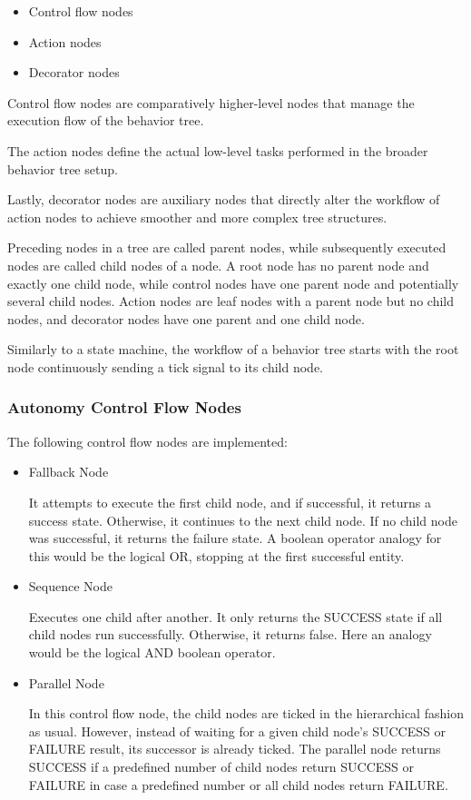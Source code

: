 \begin{itemize}
    \item Control flow nodes
    \item Action nodes
    \item Decorator nodes
    \end{itemize}
    
    Control flow nodes are comparatively higher-level nodes that manage the execution flow of the behavior tree.
    
    The action nodes define the actual low-level tasks performed in the broader behavior tree setup. 
    
    Lastly, decorator nodes are auxiliary nodes that directly alter the workflow of action nodes to achieve smoother and more complex tree structures.
    
    Preceding nodes in a tree are called parent nodes, while subsequently executed nodes are called child nodes of a node. A root node has no parent node and exactly one child node, while control nodes have one parent node and potentially several child nodes. Action nodes are leaf nodes with a parent node but no child nodes, and decorator nodes have one parent and one child node.

    Similarly to a state machine, the workflow of a behavior tree starts with the root node continuously sending a tick signal to its child node. 

    

\subsubsection{Autonomy Control Flow Nodes}

The following control flow nodes are implemented:

\begin{itemize}
    \item Fallback Node
    
    It attempts to execute the first child node, and if successful, it returns a success state. Otherwise, it continues to the next child node. If no child node was successful, it returns the failure state. A boolean operator analogy for this would be the logical OR, stopping at the first successful entity.
    \item Sequence Node
    
    Executes one child after another. It only returns the SUCCESS state if all child nodes run successfully. Otherwise, it returns false. Here an analogy would be the logical AND boolean operator.

    \item Parallel Node
    
    In this control flow node, the child nodes are ticked in the hierarchical fashion as usual. However, instead of waiting for a given child node's SUCCESS or FAILURE result, its successor is already ticked. The parallel node returns SUCCESS if a predefined number of child nodes return SUCCESS or FAILURE in case a predefined number or all child nodes return FAILURE.
\end{itemize}

